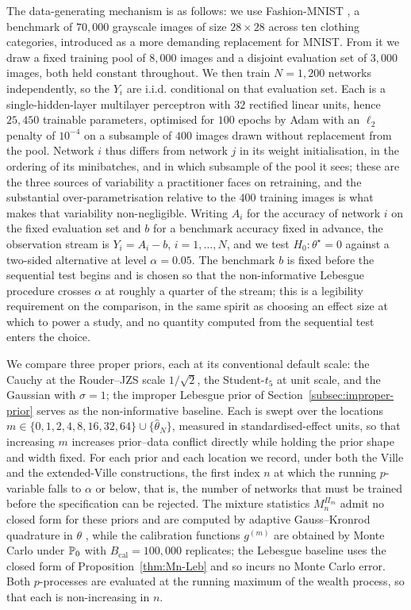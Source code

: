 The data-generating mechanism is as follows: we use Fashion-MNIST \citep{Xiao2017}, a benchmark of $70{,}000$ grayscale images of size $28\times28$ across ten clothing categories, introduced as a more demanding replacement for MNIST. From it we draw a fixed training pool of $8{,}000$ images and a disjoint evaluation set of $3{,}000$ images, both held constant throughout. We then train $N=1{,}200$ networks independently, so the $Y_i$ are i.i.d. conditional on that evaluation set. Each is a single-hidden-layer multilayer perceptron with $32$ rectified linear units, hence $25{,}450$ trainable parameters, optimised for $100$ epochs by Adam with an $\ell_2$ penalty of $10^{-4}$ on a subsample of $400$ images drawn without replacement from the pool. Network $i$ thus differs from network $j$ in its weight initialisation, in the ordering of its minibatches, and in which subsample of the pool it sees; these are the three sources of variability a practitioner faces on retraining, and the substantial over-parametrisation relative to the $400$ training images is what makes that variability non-negligible. Writing $A_i$ for the accuracy of network $i$ on the fixed evaluation set and $b$ for a benchmark accuracy fixed in advance, the observation stream is $Y_i = A_i - b$, $i=1,\ldots,N$, and we test $H_0:\theta^\star=0$ against a two-sided alternative at level $\alpha=0.05$. The benchmark $b$ is fixed before the sequential test begins and is chosen so that the non-informative Lebesgue procedure crosses $\alpha$ at roughly a quarter of the stream; this is a legibility requirement on the comparison, in the same spirit as choosing an effect size at which to power a study, and no quantity computed from the sequential test enters the choice.

We compare three proper priors, each at its conventional default scale: the Cauchy at the Rouder--JZS scale $1/\sqrt2$, the Student-$t_5$ at unit scale, and the Gaussian with $\sigma=1$; the improper Lebesgue prior of Section~\ref{subsec:improper-prior} serves as the non-informative baseline. Each is swept over the locations $m\in\{0,1,2,4,8,16,32,64\} \cup \{\widehat\theta_N\}$, measured in standardised-effect units, so that increasing $m$ increases prior--data conflict directly while holding the prior shape and width fixed. For each prior and each location we record, under both the Ville and the extended-Ville constructions, the first index $n$ at which the running $p$-variable falls to $\alpha$ or below, that is, the number of networks that must be trained before the specification can be rejected. The mixture statistics $M_n^{\Pi_m}$ admit no closed form for these priors and are computed by adaptive Gauss--Kronrod quadrature in $\theta$ \citep{piessens2012quadpack}, while the calibration functions $g^{(m)}$ are obtained by Monte Carlo under $\mathbb{P}_0$ with $B_{\mathrm{cal}}=100{,}000$ replicates; the Lebesgue baseline uses the closed form of Proposition~\ref{thm:Mn-Leb} and so incurs no Monte Carlo error. Both $p$-processes are evaluated at the running maximum of the wealth process, so that each is non-increasing in $n$.


